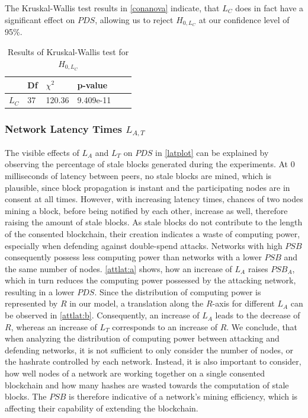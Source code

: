 \documentclass[a4paper,12pt,twoside]{report}
\begin{document}
The Kruskal-Wallis test results in \autoref{conanova} indicate, that $L_C$ does in fact have a significant effect on $PDS$, allowing us to reject $H_{0,L_C}$ at our confidence level of 95\%.
\begin{table}[hb]
\centering
\begin{tabular}{|l|l|l|l|l|l|} \hline
& Df & $\chi^{2}$ & p-value \\ \hline
$L_C$ & 37 &  120.36 & 9.409e-11 \\ \hline
\end{tabular}
\caption{Results of Kruskal-Wallis test for $H_{0,L_C}$}
\label{conanova}
\end{table}
\subsubsection{Network Latency Times $L_{A,T}$}
The visible effects of $L_{A}$ and $L_{T}$ on $PDS$ in \autoref{latplot} can be explained by observing the percentage of stale blocks generated during the experiments. At 0 milliseconds of latency between peers, no stale blocks are mined, which is plausible, since block propagation is instant and the participating nodes are in consent at all times. However, with increasing latency times, chances of two nodes mining a block, before being notified by each other, increase as well, therefore raising the amount of stale blocks. As stale blocks do not contribute to the length of the consented blockchain, their creation indicates a waste of computing power, especially when defending against double-spend attacks. Networks with high $PSB$ consequently possess less computing power than networks with a lower $PSB$ and the same number of nodes. \autoref{attlat:a} shows, how an increase of $L_{A}$ raises $PSB_A$, which in turn reduces the computing power possessed by the attacking network, resulting in a lower $PDS$. Since the distribution of computing power is represented by $R$ in our model, a translation along the $R$-axis for different $L_{A}$ can be observed in \autoref{attlat:b}. Consequently, an increase of $L_{A}$ leads to the decrease of $R$, whereas an increase of $L_{T}$ corresponds to an increase of $R$. We conclude, that when analyzing the distribution of computing power between attacking and defending networks, it is not sufficient to only consider the number of nodes, or the hashrate controlled by each network. Instead, it is also important to consider, how well nodes of a network are working together on a single consented blockchain and how many hashes are wasted towards the computation of stale blocks. The $PSB$ is therefore indicative of a network's mining efficiency, which is affecting their capability of extending the blockchain. 
\end{document}
